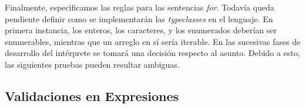 \documentclass{article}
\begin{document}
\begin{prooftree}
\end{prooftree}

\begin{prooftree}
\end{prooftree}

Finalmente, especificamos las reglas para las sentencias \textit{for}.
Todavía queda pendiente definir como se implementarán las \textit{typeclasses} en el lenguaje.
En primera instancia, los enteros, los caracteres, y los enumerados deberían ser enumerables, mientras que un arreglo en sí sería iterable.
En las sucesivas fases de desarrollo del intérprete se tomará una decisión respecto al asunto.
Debido a esto, las siguientes pruebas pueden resultar ambiguas.

\begin{prooftree}
\end{prooftree}

\begin{prooftree}
\end{prooftree}

\begin{prooftree}
\end{prooftree}

\subsection{Validaciones en Expresiones}
\end{document}

